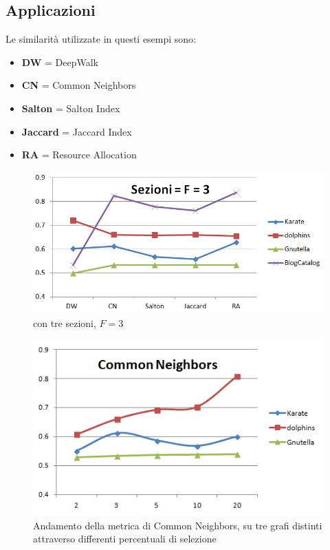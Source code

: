 \subsection{Applicazioni}
Le similarità utilizzate in questi esempi sono\cite{all_metric}:
\begin{itemize}
	\item \textbf{DW} = DeepWalk
	\item \textbf{CN} = Common Neighbors\cite{CN_metric}
	\item \textbf{Salton} = Salton Index\cite{Salton_metric}
	\item \textbf{Jaccard} = Jaccard Index
	\item \textbf{RA} = Resource Allocation\cite{RA_metric}
\end{itemize}
%
\begin{figure}[htp]
	\centering
	\includegraphics[width=\linewidth]{immagini/LP_fold3}
	\caption{\LPred con tre sezioni, $F=3$}
	\label{fig:LP_fold3}
\end{figure}
%
\begin{figure}[htp]
	\centering
	\includegraphics[width=\linewidth]{immagini/LP_CN}
	\caption{Andamento della metrica di Common Neighbors, su tre grafi distinti attraverso differenti percentuali di selezione}
	\label{fig:LP_CN}
\end{figure}
